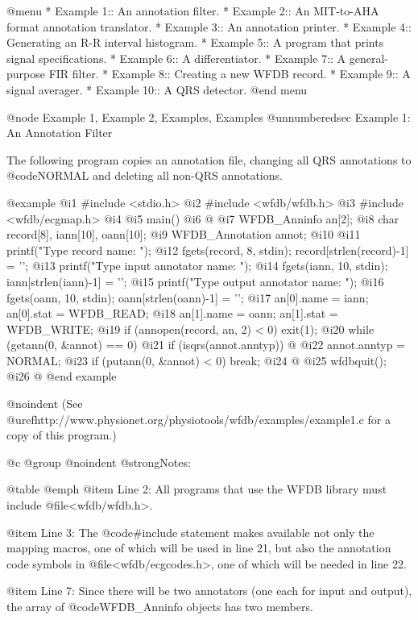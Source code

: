 {{{{{{{{{{@menu
* Example 1::			An annotation filter.
* Example 2::			An MIT-to-AHA format annotation translator.
* Example 3::			An annotation printer.
* Example 4::			Generating an R-R interval histogram.
* Example 5::			A program that prints signal specifications.
* Example 6::			A differentiator.
* Example 7::			A general-purpose FIR filter.
* Example 8::			Creating a new WFDB record.
* Example 9::			A signal averager.
* Example 10::			A QRS detector.
@end menu

@node     Example 1, Example 2, Examples, Examples
@unnumberedsec Example 1:  An Annotation Filter

The following program copies an annotation file, changing all QRS annotations
to @code{NORMAL} and deleting all non-QRS annotations.

@example
 @i{1}  #include <stdio.h>
 @i{2}  #include <wfdb/wfdb.h>
 @i{3}  #include <wfdb/ecgmap.h>
 @i{4}
 @i{5}  main()
 @i{6}  @{
 @i{7}      WFDB_Anninfo an[2];
 @i{8}      char record[8], iann[10], oann[10];
 @i{9}      WFDB_Annotation annot;
@i{10}
@i{11}      printf("Type record name: ");
@i{12}      fgets(record, 8, stdin); record[strlen(record)-1] = '\0';
@i{13}      printf("Type input annotator name: ");
@i{14}      fgets(iann, 10, stdin); iann[strlen(iann)-1] = '\0';
@i{15}      printf("Type output annotator name: ");
@i{16}      fgets(oann, 10, stdin); oann[strlen(oann)-1] = '\0';
@i{17}      an[0].name = iann; an[0].stat = WFDB_READ;
@i{18}      an[1].name = oann; an[1].stat = WFDB_WRITE;
@i{19}      if (annopen(record, an, 2) < 0) exit(1);
@i{20}      while (getann(0, &annot) == 0)
@i{21}          if (isqrs(annot.anntyp)) @{
@i{22}              annot.anntyp = NORMAL;
@i{23}              if (putann(0, &annot) < 0) break;
@i{24}          @}
@i{25}      wfdbquit();
@i{26}  @}
@end example

@noindent
(See @uref{http://www.physionet.org/physiotools/wfdb/examples/example1.c}
for a copy of this program.)

@c @group
@noindent
@strong{Notes:}

@table @emph
@item Line 2:
All programs that use the WFDB library must include
@file{<wfdb/wfdb.h>}.

@item Line 3:
The @code{#include} statement makes available not only the mapping
macros, one of which will be used in line 21, but also the
annotation code symbols in @file{<wfdb/ecgcodes.h>}, one of which
will be needed in line 22.

@item Line 7:
Since there will be two annotators (one each for input and output),
the array of @code{WFDB_Anninfo} objects has two members.

}}}}}}}}}}
